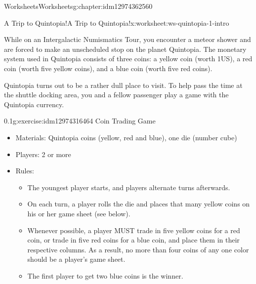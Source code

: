 \documentclass[twoside,11pt,]{book}
\begin{document}
\begin{chapterptx}{Worksheets}{}{Worksheets}{}{}{g:chapter:idm12974362560}
%
%
\typeout{************************************************}
\typeout{************************************************}
%
\begin{worksheet-section-numberless}{A Trip to Quintopia!}{}{A Trip to Quintopia!}{}{}{x:worksheet:ws-quintopia-1-intro}
\begin{introduction}{}%
While on an Intergalactic Numismatics Tour, you encounter a meteor shower and are forced to make an unscheduled stop on the planet Quintopia.  The monetary system used in Quintopia consists of three coins:  a yellow coin (worth \textdollar{}1US), a red coin (worth five yellow coins), and a blue coin (worth five red coins).%
\par
Quintopia turns out to be a rather dull place to visit.  To help pass the time at the shuttle docking area, you and a fellow passenger play a game with the Quintopia currency.%
\end{introduction}%
\begin{divisionexercise}{1}{}{0.1}{g:exercise:idm12974316464}%
Coin Trading Game%
%
\begin{itemize}[label=\textbullet]
\item{}Materials:  Quintopia coins (yellow, red and blue), one die (number cube)%
\item{}Players:  2 or more%
\item{}Rules:%
\begin{itemize}[label=$\circ$]
\item{}The youngest player starts, and players alternate turns afterwards.%
\item{}On each turn, a player rolls the die and places that many yellow coins on his or her game sheet (see below).%
\item{}Whenever possible, a player MUST trade in five yellow coins for a red coin, or trade in five red coins for a blue coin, and place them in their respective columns.  As a result, no more than four coins of any one color should be a player’s game sheet.%
\item{}The first player to get two blue coins is the winner.%
\end{itemize}
%
\end{itemize}
\begin{sidebyside}{1}{0.05}{0.05}{0}%
\begin{sbspanel}{0.9}%

\end{sbspanel}
\end{sidebyside}
\end{divisionexercise}
\end{worksheet-section-numberless}
\end{chapterptx}
\end{document}
